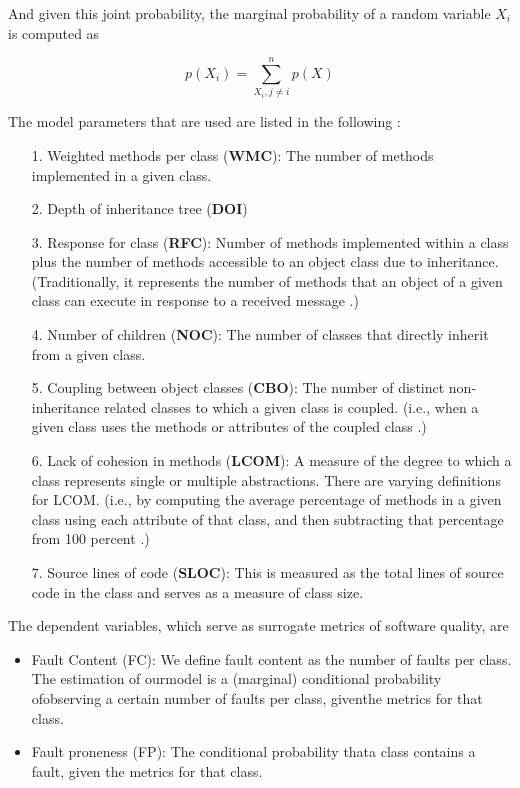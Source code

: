 And given this joint probability, the marginal probability of a random variable $X_i$ is computed as 

\begin{displaymath}
	p(X_i)= \sum_{X_i,j\neq i}^{n}p(X)
\end{displaymath}

The model parameters that are used are listed in the following \cite{b9pai2007empirical}: 

\begin{itemize}
	\item[1.] Weighted methods per class (\textbf{WMC}): The number of methods implemented in a given class.
	\item[2.] Depth of inheritance tree (\textbf{DOI})
	\item[3.] Response for class (\textbf{RFC}): Number of methods implemented within a class plus the number of methods accessible to an object class due to inheritance. (Traditionally, it represents the number of methods that an object of a given class can execute in response to a received message \cite{b9pai2007empirical}.)
	\item[4.] Number of children (\textbf{NOC}): The number of classes that directly inherit from a given class.
	\item[5.] Coupling between object classes (\textbf{CBO}): The number of distinct non-inheritance related classes to which a given class is coupled. (i.e., when a given class uses the methods or attributes of the coupled class \cite{b9pai2007empirical}.)
	\item[6.] Lack of cohesion in methods (\textbf{LCOM}): A measure of the degree to which a class represents single or multiple abstractions. There are varying definitions for LCOM. (i.e., by computing the average percentage of methods in a given class using each attribute of that class, and then subtracting that percentage from 100 percent \cite{b9pai2007empirical}.)
	\item[7.] Source lines of code (\textbf{SLOC}): This is measured as the total lines of source code in the class and serves as a measure of class size.
\end{itemize}

The dependent variables, which serve as surrogate metrics of software quality, are
\begin{itemize}
	\item Fault Content (FC): We define fault content as the number of faults per class. The estimation of ourmodel is a (marginal) conditional probability ofobserving a certain number of faults per class, giventhe metrics for that class.
	\item Fault proneness (FP): The conditional probability thata class contains a fault, given the metrics for that class.
\end{itemize}

